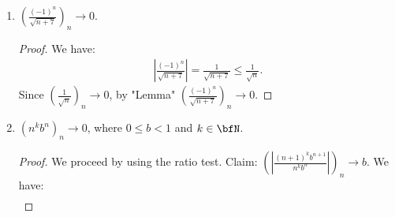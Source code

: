 \documentclass[10pt,twoside,openany]{memoir}
\begin{document}
\begin{exercise}
\begin{enumerate}[label = (\arabic*)]
\begin{proof}
\begin{equation*}
                            \end{equation*}
                        Claim: $\left(\frac{1}{\sqrt{n}}\right)_n \rightarrow 0$. Let $\epsilon > 0$. There exists $N_\epsilon \in \bfN$ such that $\frac{1}{\epsilon^2} < N_\epsilon$. If $n \geq N_\epsilon$, then $n > \frac{1}{\epsilon^2}$ gives:
                            \begin{equation*}
                            \begin{split}
                                \frac{1}{\epsilon^2} < n 
                                &\implies \frac{1}{n} < \epsilon^2 \\
                                &\implies \frac{1}{\sqrt{n}} < \epsilon \\
                                &\implies \left|\frac{1}{\sqrt{n}}\right| < \epsilon.
                            \end{split}
                            \end{equation*}
                        Since $\left(\frac{1}{\sqrt{n}}\right)_n \rightarrow 0$, by "Lemma" $\left(\frac{\sqrt{n}}{n+1}\right)_n \rightarrow 0$.
                    \end{proof}
                \item $\left(\frac{(-1)^n}{\sqrt{n+7}}\right)_n \rightarrow 0$.
                    \begin{proof}
                        We have:
                            \begin{equation*}
                            \begin{split}
                                \left|\frac{(-1)^n}{\sqrt{n+7}}\right| = \frac{1}{\sqrt{n+7}} \leq \frac{1}{\sqrt{n}}.
                            \end{split}
                            \end{equation*}
                        Since $\left(\frac{1}{\sqrt{n}}\right)_n \rightarrow 0$, by "Lemma" $\left(\frac{(-1)^n}{\sqrt{n+7}}\right)_n \rightarrow 0$.
                    \end{proof}
                \item $(n^k b^n)_n \rightarrow 0$, where $0 \leq b < 1$ and $k \in \bfN$.
                    \begin{proof}
                        We proceed by using the ratio test. Claim: $\left(\left|\frac{(n+1)^k b^{n+1}}{n^k b^n}\right|\right)_n \rightarrow b$. We have:
                            \begin{equation*}
                            \begin{split}

\end{split}
\end{equation*}
\end{proof}
\end{enumerate}
\end{exercise}
\end{document}
